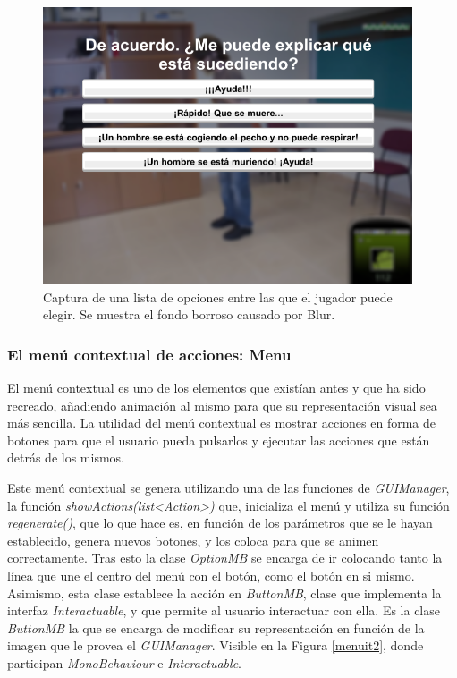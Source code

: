 \begin{figure}[h!]
	\centerline{\includegraphics[width=4.3in]{figures/it2/apearance/blur.png}}
	\caption[Apearance - Blur y opciones]{Captura de una lista de opciones entre las que el jugador puede elegir. Se muestra el fondo borroso causado por Blur.}
	\label{blurit2}
\end{figure}

\subsubsection{El menú contextual de acciones: Menu}

El menú contextual es uno de los elementos que existían antes y que ha sido recreado, añadiendo animación al mismo para que su representación visual sea más sencilla. La utilidad del menú contextual es mostrar acciones en forma de botones para que el usuario pueda pulsarlos y ejecutar las acciones que están detrás de los mismos.

Este menú contextual se genera utilizando una de las funciones de \textit{GUIManager}, la función \textit{showActions(list<Action>)} que, inicializa el menú y utiliza su función \textit{regenerate()}, que lo que hace es, en función de los parámetros que se le hayan establecido, genera nuevos botones, y los coloca para que se animen correctamente. Tras esto la clase \textit{OptionMB} se encarga de ir colocando tanto la línea que une el centro del menú con el botón, como el botón en si mismo. Asimismo, esta clase establece la acción en \textit{ButtonMB}, clase que implementa la interfaz \textit{Interactuable}, y que permite al usuario interactuar con ella. Es la clase \textit{ButtonMB} la que se encarga de modificar su representación en función de la imagen que le provea el \textit{GUIManager}. Visible en la Figura \ref{menuit2}, donde participan \textit{MonoBehaviour} e \textit{Interactuable}.


